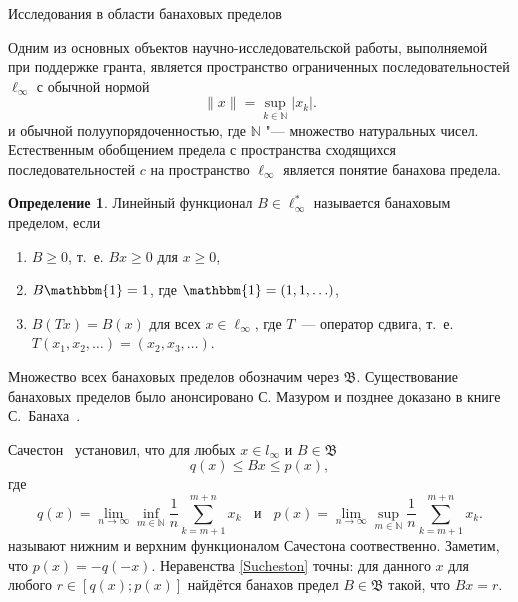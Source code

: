 \documentclass[a4paper,openbib]{report}
\renewcommand{\geq}{\geqslant} %
\theoremstyle{definition}
\newtheorem{definition}[lemma]{Определение}
\begin{document}

\setcounter{page}{2}

\begin{center}
	\LARGE
	Исследования в области банаховых пределов
\end{center}
\vspace{7em}


Одним из основных объектов научно-исследовательской работы, выполняемой при поддержке гранта,
является пространство ограниченных последовательностей $\ell_\infty$ с обычной нормой
\begin{equation*}
	\|x\| = \sup_{k\in\mathbb{N}} |x_k|
	.
\end{equation*}
и обычной полуупорядоченностью, где $\mathbb{N}$ "--- множество натуральных чисел.
Естественным обобщением предела с пространства сходящихся последовательностей $c$ на пространство $\ell_\infty$
является понятие банахова предела.


\begin{definition}
	Линейный функционал $B\in \ell_\infty^*$ называется банаховым пределом,
	если
	\begin{enumerate}
		\item
			$B\geq0$, т.~е. $Bx \geq 0$ для $x \geq 0$,
		\item
			$B\mathbbm{1}=1$, где $\mathbbm{1} =(1,1,\ldots)$,
		\item
			$B(Tx)=B(x)$ для всех $x\in \ell_\infty$, где $T$~---
		оператор сдвига, т.~е. $T(x_1,x_2,\ldots)=(x_2,x_3,\ldots)$.
	\end{enumerate}
\end{definition}
Множество всех банаховых пределов обозначим через $\mathfrak{B}$.
Существование банаховых пределов было анонсировано С. Мазуром \cite{Mazur} и позднее доказано в книге С.~Банаха~\cite{B}.


Сачестон~\cite{sucheston1967banach} установил, что
для любых $x\in l_\infty$ и $B\in\mathfrak{B}$
\begin{equation}\label{Sucheston}
	q(x) \leqslant Bx \leqslant p(x)
	,
\end{equation}
где
\begin{equation*}
	q(x) = \lim_{n\to\infty} \inf_{m\in\mathbb{N}}  \frac{1}{n} \sum_{k=m+1}^{m+n} x_k
	~~~~\mbox{и}~~~~
	p(x) = \lim_{n\to\infty} \sup_{m\in\mathbb{N}}  \frac{1}{n} \sum_{k=m+1}^{m+n} x_k
	.
\end{equation*}
называют нижним и верхним функционалом Сачестона соотвественно.
Заметим, что $p(x) = -q(-x)$.
Неравенства \eqref{Sucheston} точны:
для данного $x$ для любого $r\in[q(x); p(x)]$ найдётся банахов предел
$B\in\mathfrak{B}$ такой, что $Bx = r$.
\end{document}
